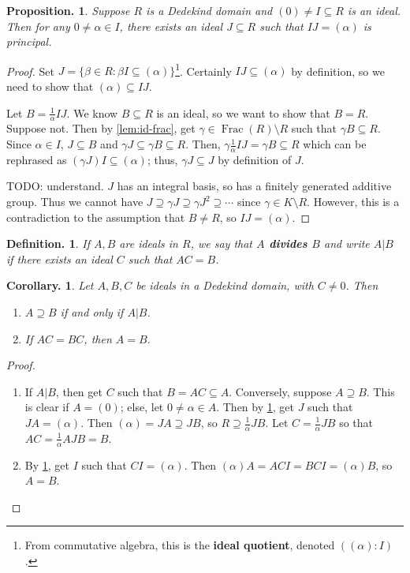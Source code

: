 \documentclass[11pt, a4paper]{memoir}
\theoremstyle{change}
\newtheorem{corollary}[theorem]{Corollary.}
\newtheorem{proposition}[theorem]{Proposition.}
\theoremstyle{plain}
\theoremstyle{nonumberplain}
\newtheorem{definition}{Definition.}
\newtheorem{proof}{Proof}
\DeclareMathOperator{\Frac}{Frac}
\newcommand{\mbf}[1]{{\boldmath\bfseries #1}}
\numberwithin{equation}{section}
\begin{document}
\begin{proposition}\label{prop:id-inv}
    Suppose $R$ is a Dedekind domain and $(0)\neq I\subseteq R$ is an ideal.
    Then for any $0\neq \alpha\in I$, there exists an ideal $J\subseteq R$ such that $IJ=(\alpha)$ is principal.
\end{proposition}
\begin{proof}
    Set $J=\{\beta\in R:\beta I\subseteq(\alpha)\}$\footnote{From commutative algebra, this is the \textbf{ideal quotient}, denoted $((\alpha):I)$.}.
    Certainly $IJ\subseteq(\alpha)$ by definition, so we need to show that $(\alpha)\subseteq IJ$.

    Let $B=\frac{1}{\alpha}IJ$.
    We know $B\subseteq R$ is an ideal, so we want to show that $B=R$.
    Suppose not.
    Then by \cref{lem:id-frac}, get $\gamma\in \Frac(R)\setminus R$ such that $\gamma B\subseteq R$.
    Since $\alpha\in I$, $J\subseteq B$ and $\gamma J\subseteq\gamma B\subseteq R$.
    Then, $\gamma\frac{1}{\alpha} IJ=\gamma B\subseteq R$ which can be rephrased as $(\gamma J)I\subseteq(\alpha)$; thus, $\gamma J\subseteq J$ by definition of $J$.

    TODO: understand.
    $J$ has an integral basis, so has a finitely generated additive group.
    Thus we cannot have $J\supseteq\gamma J\supseteq\gamma J^2\supseteq\cdots$ since $\gamma\in K\setminus R$.
    However, this is a contradiction to the assumption that $B\neq R$, so $IJ=(\alpha)$.
\end{proof}
\begin{definition}
    If $A,B$ are ideals in $R$, we say that \mbf{$A$ divides $B$} and write $A|B$ if there exists an ideal $C$ such that $AC=B$.
\end{definition}
\begin{corollary}\label{cor:id-div}
    Let $A,B,C$ be ideals in a Dedekind domain, with $C\neq 0$.
    Then
    \begin{enumerate}[nolistsep,label=(\roman*)]
        \item $A\supseteq B$ if and only if $A|B$.
        \item If $AC=BC$, then $A=B$.
    \end{enumerate}
\end{corollary}
\begin{proof}
    \begin{enumerate}[label=(\roman*)]
        \item If $A|B$, then get $C$ such that $B=AC\subseteq A$.
            Conversely, suppose $A\supseteq B$.
            This is clear if $A=(0)$; else, let $0\neq\alpha\in A$.
            Then by \cref{prop:id-inv}, get $J$ such that $JA=(\alpha)$.
            Then $(\alpha)=JA\supseteq JB$, so $R\supseteq\frac{1}{\alpha}JB$.
            Let $C=\frac{1}{\alpha}JB$ so that $AC=\frac{1}{\alpha}AJB=B$.
        \item By \cref{prop:id-inv}, get $I$ such that $CI=(\alpha)$.
            Then $(\alpha)A=ACI=BCI=(\alpha)B$, so $A=B$.
    \end{enumerate}
\end{proof}
\end{document}
